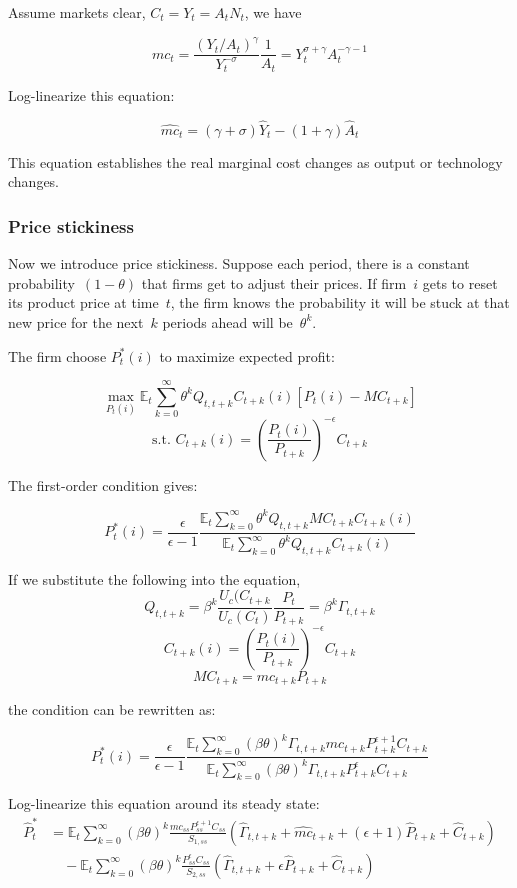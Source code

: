 \documentclass[10pt,a4]{article}
\begin{document}
Assume markets clear, $C_t= Y_t=A_tN_t$, we have 

$$ mc_t = \frac{(Y_t/A_t)^{\gamma}}{Y_t^{-\sigma}}\frac{1}{A_t} = Y_t^{\sigma+\gamma} A_t^{-\gamma-1}$$

Log-linearize this equation:

$$ \hat{mc}_t = (\gamma+\sigma)\hat Y_t - (1+\gamma)\hat A_t $$

This equation establishes the real marginal cost changes as output or
technology changes.

\par\null

\subsubsection{Price stickiness}

{\label{195467}}

Now we introduce price stickiness. Suppose each period, there is a
constant probability~\(\left(1-\theta\right)\) that firms get to adjust their
prices. If firm~\(i\) gets to reset its product price at
time~\(t\), the firm knows the probability it will be stuck
at that new price for the next~\(k\) periods ahead will
be~\(\theta^k\).

The firm choose $P_t^*(i)$ to maximize expected profit:

$$ \max_{P_t(i)}\mathbb{E}_t\sum_{k=0}^{\infty} \theta^k Q_{t,t+k} C_{t+k}(i)[P_t(i) - MC_{t+k}] $$
$$\textrm{s.t. } C_{t+k}(i) = \left(\frac{P_t(i)}{P_{t+k}}\right)^{-\epsilon} C_{t+k} $$

The first-order condition gives:

$$P_t^*(i) = \frac{\epsilon}{\epsilon-1}\frac{\mathbb{E}_t\sum_{k=0}^{\infty}\theta^kQ_{t,t+k}MC_{t+k}C_{t+k}(i)}{\mathbb{E}_t\sum_{k=0}^{\infty}\theta^kQ_{t,t+k}C_{t+k}(i)}$$

If we substitute the following into the equation, $$Q_{t,t+k}=\beta^k\frac{U_c(C_{t+k}}{U_c(C_t)}\frac{P_t}{P_{t+k}} = \beta^k \Gamma_{t,t+k}$$
$$C_{t+k}(i) = \left(\frac{P_t(i)}{P_{t+k}}\right)^{-\epsilon} C_{t+k}$$
$$MC_{t+k} = mc_{t+k}P_{t+k}$$

the condition can be rewritten as:

$$P_t^*(i) = \frac{\epsilon}{\epsilon-1}\frac{\mathbb{E}_t\sum_{k=0}^{\infty}(\beta\theta)^k \Gamma_{t,t+k}mc_{t+k}P_{t+k}^{\epsilon+1}C_{t+k}}{\mathbb{E}_t\sum_{k=0}^{\infty}(\beta\theta)^k \Gamma_{t,t+k}P_{t+k}^{\epsilon}C_{t+k}}$$

Log-linearize this equation around its steady state:
$$ 
\begin{aligned}
\hat P_t^* &= \mathbb{E}_t \sum_{k=0}^{\infty}(\beta\theta)^k\frac{mc_{ss}P_{ss}^{\epsilon+1}C_{ss}}{S_{1,ss}}(\hat\Gamma_{t,t+k} + \hat{mc}_{t+k}+(\epsilon+1)\hat P_{t+k}+\hat C_{t+k}) \\
&\quad - \mathbb{E}_t\sum_{k=0}^{\infty}(\beta\theta)^k\frac{P_{ss}^{\epsilon}C_{ss}}{S_{2,ss}}(\hat\Gamma_{t,t+k} + \epsilon\hat P_{t+k}+\hat C_{t+k})
\end{aligned}
$$
\end{document}
